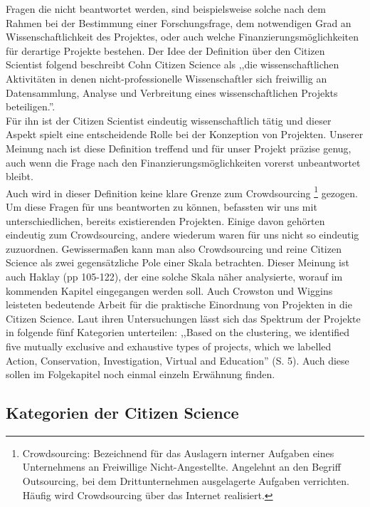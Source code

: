 \documentclass{article}
\begin{document}
Fragen die nicht beantwortet werden, sind beispielsweise solche nach dem Rahmen bei der Bestimmung einer Forschungsfrage,
dem notwendigen Grad an Wissenschaftlichkeit des Projektes, oder auch welche Finanzierungsmöglichkeiten für derartige Projekte bestehen.
Der Idee der Definition über den Citizen Scientist folgend beschreibt Cohn Citizen Science als
,,die wissenschaftlichen Aktivitäten in denen nicht-professionelle Wissenschaftler sich freiwillig an Datensammlung,
Analyse und Verbreitung eines wissenschaftlichen Projekts beteiligen.''\cite{Cohn}.\\
Für ihn ist der Citizen Scientist eindeutig wissenschaftlich tätig und dieser Aspekt spielt eine entscheidende Rolle
bei der Konzeption von Projekten. Unserer Meinung nach ist diese Definition treffend und für unser Projekt präzise genug,
auch wenn die Frage nach den Finanzierungsmöglichkeiten vorerst unbeantwortet bleibt.\\
Auch wird in dieser Definition keine klare Grenze zum Crowdsourcing
\footnote{Crowdsourcing: Bezeichnend für das Auslagern interner Aufgaben eines Unternehmens an Freiwillige Nicht-Angestellte.
Angelehnt an den Begriff Outsourcing, bei dem Drittunternehmen ausgelagerte Aufgaben verrichten.
Häufig wird Crowdsourcing über das Internet realisiert.} gezogen.\\
Um diese Fragen für uns beantworten zu können, befassten wir uns mit unterschiedlichen, bereits existierenden Projekten.
Einige davon gehörten eindeutig zum Crowdsourcing, andere wiederum waren für uns nicht so eindeutig zuzuordnen.
Gewissermaßen kann man also Crowdsourcing und reine Citizen Science als zwei gegensätzliche Pole einer Skala betrachten.
Dieser Meinung ist auch Haklay\cite{Haklay} (pp 105-122), der eine solche Skala näher analysierte,
worauf im kommenden Kapitel eingegangen werden soll.
Auch Crowston und Wiggins\cite{CW} leisteten bedeutende Arbeit für die praktische Einordnung von Projekten in die Citizen Science.
Laut ihren Untersuchungen lässt sich das Spektrum der Projekte in folgende fünf Kategorien unterteilen:
,,Based on the clustering, we identified five mutually exclusive and exhaustive types of projects,
which we labelled Action, Conservation, Investigation, Virtual and Education'' (S. 5).
Auch diese sollen im Folgekapitel noch einmal einzeln Erwähnung finden.


\subsection{Kategorien der Citizen Science}
\end{document}
